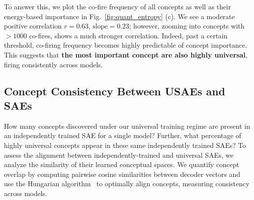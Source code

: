 To answer this, we plot the co-fire frequency of all concepts as well as their energy-based importance in Fig.~\ref{fig:quant_entropy} (c). We see a moderate positive correlation \(r=0.63\text{, slope}=0.23\); however, zooming into concepts with $>1000$ co-fires, shows a much stronger correlation. Indeed, past a certain threshold, co-firing frequency becomes highly predictable of concept importance. This suggests that \textbf{the most important concept are also highly universal}, firing consistently across models. 



















\vspace{-2mm}
\subsection{Concept Consistency Between USAEs and SAEs}\label{sec:consistency}
\vspace{-1mm}
How many concepts discovered under our universal training regime are present in an independently trained SAE for a single model? Further, what percentage of highly universal concepts appear in these same independently trained SAEs? 
To assess the alignment between independently-trained and universal SAEs, we analyze the similarity of their learned conceptual spaces. 
We quantify concept overlap by computing pairwise cosine similarities between decoder vectors and use the Hungarian algorithm~\cite{kuhn1955hungarian} to optimally align concepts, measuring consistency across models.









